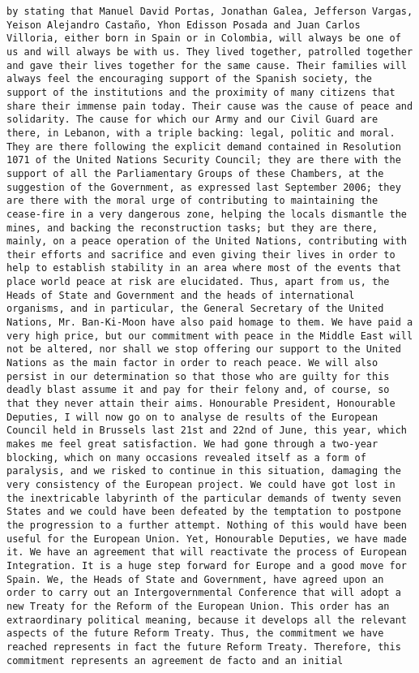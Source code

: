 \documentclass[
]{article}
\begin{document}
\begin{verbatim}
by stating that Manuel David Portas, Jonathan Galea, Jefferson Vargas, Yeison Alejandro Castaño, Yhon Edisson Posada and Juan Carlos Villoria, either born in Spain or in Colombia, will always be one of us and will always be with us. They lived together, patrolled together and gave their lives together for the same cause. Their families will always feel the encouraging support of the Spanish society, the support of the institutions and the proximity of many citizens that share their immense pain today. Their cause was the cause of peace and solidarity. The cause for which our Army and our Civil Guard are there, in Lebanon, with a triple backing: legal, politic and moral. They are there following the explicit demand contained in Resolution 1071 of the United Nations Security Council; they are there with the support of all the Parliamentary Groups of these Chambers, at the suggestion of the Government, as expressed last September 2006; they are there with the moral urge of contributing to maintaining the cease-fire in a very dangerous zone, helping the locals dismantle the mines, and backing the reconstruction tasks; but they are there, mainly, on a peace operation of the United Nations, contributing with their efforts and sacrifice and even giving their lives in order to help to establish stability in an area where most of the events that place world peace at risk are elucidated. Thus, apart from us, the Heads of State and Government and the heads of international organisms, and in particular, the General Secretary of the United Nations, Mr. Ban-Ki-Moon have also paid homage to them. We have paid a very high price, but our commitment with peace in the Middle East will not be altered, nor shall we stop offering our support to the United Nations as the main factor in order to reach peace. We will also persist in our determination so that those who are guilty for this deadly blast assume it and pay for their felony and, of course, so that they never attain their aims. Honourable President, Honourable Deputies, I will now go on to analyse de results of the European Council held in Brussels last 21st and 22nd of June, this year, which makes me feel great satisfaction. We had gone through a two-year blocking, which on many occasions revealed itself as a form of paralysis, and we risked to continue in this situation, damaging the very consistency of the European project. We could have got lost in the inextricable labyrinth of the particular demands of twenty seven States and we could have been defeated by the temptation to postpone the progression to a further attempt. Nothing of this would have been useful for the European Union. Yet, Honourable Deputies, we have made it. We have an agreement that will reactivate the process of European Integration. It is a huge step forward for Europe and a good move for Spain. We, the Heads of State and Government, have agreed upon an order to carry out an Intergovernmental Conference that will adopt a new Treaty for the Reform of the European Union. This order has an extraordinary political meaning, because it develops all the relevant aspects of the future Reform Treaty. Thus, the commitment we have reached represents in fact the future Reform Treaty. Therefore, this commitment represents an agreement de facto and an initial 
\end{verbatim}
\end{document}
